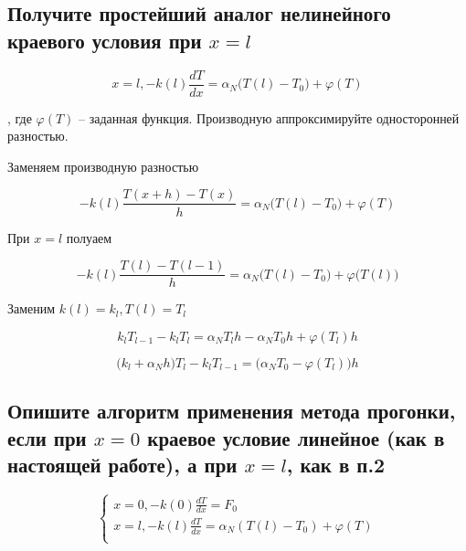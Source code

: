 \subsection{Получите простейший аналог нелинейного краевого условия при $x = l$}

\begin{equation*}
    x = l, -k(l) \frac{dT}{dx} = \alpha_N \big( T(l) - T_0 \big) + \varphi(T)
\end{equation*}

, где $\varphi(T)$ -- заданная функция. Производную аппроксимируйте односторонней разностью.

Заменяем производную разностью

\begin{equation*}
    -k(l) \frac{T(x + h) - T(x)}{h} = \alpha_N \big( T(l) - T_0 \big) + \varphi(T)
\end{equation*}

При $x = l$ полуаем

\begin{equation*}
    -k(l) \frac{T(l) - T(l-1)}{h} = \alpha_N \big(T(l) - T_0 \big) +
    \varphi \big(T(l) \big)
\end{equation*}

Заменим $k(l) = k_l, T(l) = T_l$

\begin{equation*}
    k_l T_{l-1} - k_l T_l = \alpha_N T_l h - \alpha_NT_0 h + \varphi(T_l) h
\end{equation*}

\begin{equation*}
    \big( k_l + \alpha_N h \big) T_l - k_l T_{l-1} = \big( \alpha_NT_0 - \varphi(T_l) \big) h
\end{equation*}

\subsection{Опишите алгоритм применения метода прогонки, если при $x=0$ краевое условие линейное (как в настоящей работе), а при $x=l$, как в п.2}

\begin{equation*}
    \begin{cases}
        x = 0, -k(0) \frac{dT}{dx} = F_0 \\
        x = l, -k(l) \frac{dT}{dx} = \alpha_N(T(l) - T_0) + \varphi(T) \\
    \end{cases}
\end{equation*}

